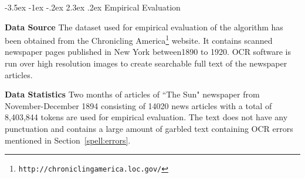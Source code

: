 \documentclass[12pt]{article}
\makeatletter
\renewcommand\section{\@startsection{section}{1}{\z@}%
                                  {-3.5ex \@plus -1ex \@minus -.2ex}%
                                  {2.3ex \@plus.2ex}%
                                  {\normalfont\bfseries}}
\makeatother
\begin{document}
\section{Empirical Evaluation}
\label{spell:results}

\noindent \textbf{Data Source} 
The dataset used for empirical evaluation of the algorithm has been obtained from the Chronicling America\footnote{\texttt{http://chroniclingamerica.loc.gov/}} website. It contains scanned newspaper pages published in New York between1890 to 1920. OCR software is run over high
resolution images to create searchable full text of the newspaper articles.


\noindent \textbf{Data Statistics }%
Two months of articles of ``The Sun" newspaper from November-December 1894 consisting of 14020 news articles with a total of 8,403,844 tokens are used for empirical evaluation. %
The text does not have any punctuation and contains a large amount of garbled text containing OCR errors mentioned in Section~\ref{spell:errors}.
\end{document}
